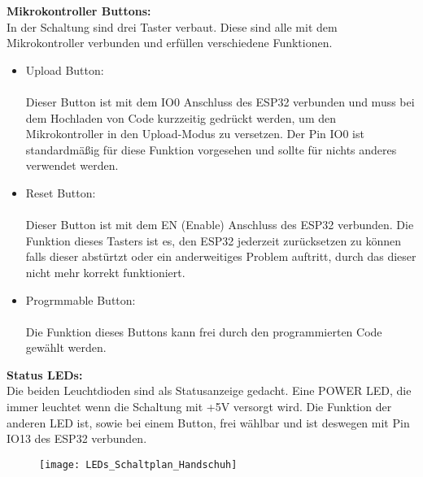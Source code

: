 \documentclass[11pt]{article}
\begin{document}
\textbf{Mikrokontroller Buttons:}
\\
In der Schaltung sind drei Taster verbaut. Diese sind alle mit dem Mikrokontroller verbunden und erfüllen verschiedene Funktionen.
\begin{itemize}
	\item Upload Button: \\
		  \\ 
		  Dieser Button ist mit dem IO0 Anschluss des ESP32 verbunden und muss bei dem Hochladen von Code kurzzeitig gedrückt 
		  werden, um den Mikrokontroller in den Upload-Modus zu versetzen. Der Pin IO0 ist standardmäßig für diese Funktion vorgesehen
		  und sollte für nichts anderes verwendet werden. 
	\item Reset Button: \\
		  \\
		  Dieser Button ist mit dem EN (Enable) Anschluss des ESP32 verbunden. Die Funktion dieses Tasters ist es, den ESP32 jederzeit 
		  zurücksetzen zu können falls dieser abstürtzt oder ein anderweitiges Problem auftritt, durch das dieser nicht mehr korrekt
		  funktioniert.
	\item Progrmmable Button: \\
		  \\
		  Die Funktion dieses Buttons kann frei durch den programmierten Code gewählt werden. 
\end{itemize}

\textbf{Status LEDs:}
\\
Die beiden Leuchtdioden sind als Statusanzeige gedacht. Eine POWER LED, die immer leuchtet wenn die Schaltung mit +5V
versorgt wird. Die Funktion der anderen LED ist, sowie bei einem Button, frei wählbar und ist deswegen mit Pin IO13 des ESP32
verbunden. \\
\begin{figure}[H]
	\begin{center}
		\scalebox{0.5}
		{\texttt{[image: LEDs\_Schaltplan\_Handschuh]}}
	\end{center}
\end{figure}
\end{document}
